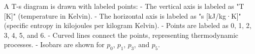 A T-s diagram is drawn with labeled points:  
- The vertical axis is labeled as "T [K]" (temperature in Kelvin).  
- The horizontal axis is labeled as "s [kJ/kg·K]" (specific entropy in kilojoules per kilogram Kelvin).  
- Points are labeled as 0, 1, 2, 3, 4, 5, and 6.  
- Curved lines connect the points, representing thermodynamic processes.  
- Isobars are shown for \( p_0 \), \( p_1 \), \( p_3 \), and \( p_5 \).